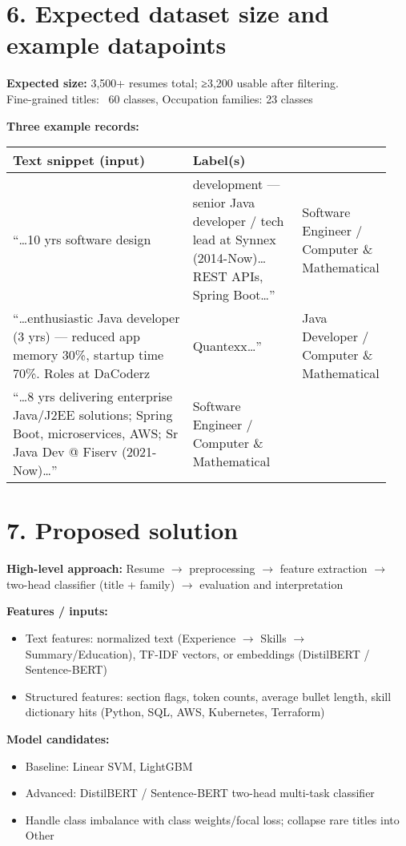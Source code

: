\documentclass[12pt]{article}
\begin{document}
\section*{6. Expected dataset size and example datapoints}
\textbf{Expected size:} 3,500+ resumes total; ≥3,200 usable after filtering. \\
Fine-grained titles: ~60 classes, Occupation families: 23 classes

\textbf{Three example records:} \\[2pt]
\begin{tabular}{p{0.62\linewidth} p{0.32\linewidth}}
\toprule
Text snippet (input) & Label(s) \\
\midrule
“…10 yrs software design & development — senior Java developer / tech lead at Synnex (2014-Now)… REST APIs, Spring Boot…” & Software Engineer / Computer \& Mathematical \\
“…enthusiastic Java developer (3 yrs) — reduced app memory 30\%, startup time 70\%. Roles at DaCoderz & Quantexx…” & Java Developer / Computer \& Mathematical \\
“…8 yrs delivering enterprise Java/J2EE solutions; Spring Boot, microservices, AWS; Sr Java Dev @ Fiserv (2021-Now)…” & Software Engineer / Computer \& Mathematical \\
\bottomrule
\end{tabular}

\section*{7. Proposed solution}
\textbf{High-level approach:} Resume $\rightarrow$ preprocessing $\rightarrow$ feature extraction $\rightarrow$ two-head classifier (title + family) $\rightarrow$ evaluation and interpretation

\textbf{Features / inputs:}
\begin{itemize}
  \item Text features: normalized text (Experience $\rightarrow$ Skills $\rightarrow$ Summary/Education), TF-IDF vectors, or embeddings (DistilBERT / Sentence-BERT)
  \item Structured features: section flags, token counts, average bullet length, skill dictionary hits (Python, SQL, AWS, Kubernetes, Terraform)
\end{itemize}

\textbf{Model candidates:}
\begin{itemize}
  \item Baseline: Linear SVM, LightGBM
  \item Advanced: DistilBERT / Sentence-BERT two-head multi-task classifier
  \item Handle class imbalance with class weights/focal loss; collapse rare titles into Other
\end{itemize}
\end{document}

